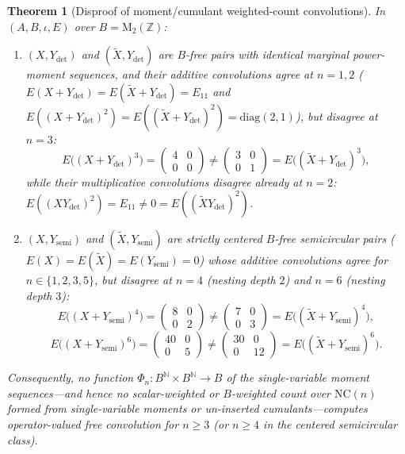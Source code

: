 \documentclass[11pt,a4paper]{article}
\newtheorem{theorem}{Theorem}[section]
\theoremstyle{definition}
\newcommand{\NC}{\mathrm{NC}}
\newcommand{\Mat}{\mathrm{M}}
\begin{document}
\begin{theorem}[Disproof of moment/cumulant weighted-count convolutions]\label{thm:moment-disproof}
In $(A, B, \iota, E)$ over $B = \Mat_2(\mathbb{Z})$:
\begin{enumerate}
\item $(X, Y_{\det})$ and $(\tilde{X}, Y_{\det})$ are $B$-free pairs with identical marginal power-moment sequences, and their additive convolutions agree at $n = 1, 2$ ($E(X + Y_{\det}) = E(\tilde{X} + Y_{\det}) = E_{11}$ and $E((X + Y_{\det})^2) = E((\tilde{X} + Y_{\det})^2) = \mathrm{diag}(2, 1)$), but disagree at $n = 3$:
\[
E\bigl((X + Y_{\det})^3\bigr) = \begin{pmatrix} 4 & 0 \\ 0 & 0 \end{pmatrix} \neq \begin{pmatrix} 3 & 0 \\ 0 & 1 \end{pmatrix} = E\bigl((\tilde{X} + Y_{\det})^3\bigr),
\]
while their multiplicative convolutions disagree already at $n = 2$: $E((X Y_{\det})^2) = E_{11} \neq 0 = E((\tilde{X} Y_{\det})^2)$.
\item $(X, Y_{\mathrm{semi}})$ and $(\tilde{X}, Y_{\mathrm{semi}})$ are strictly centered $B$-free semicircular pairs ($E(X) = E(\tilde{X}) = E(Y_{\mathrm{semi}}) = 0$) whose additive convolutions agree for $n \in \{1, 2, 3, 5\}$, but disagree at $n = 4$ (nesting depth $2$) and $n = 6$ (nesting depth $3$):
\[
E\bigl((X + Y_{\mathrm{semi}})^4\bigr) = \begin{pmatrix} 8 & 0 \\ 0 & 2 \end{pmatrix} \neq \begin{pmatrix} 7 & 0 \\ 0 & 3 \end{pmatrix} = E\bigl((\tilde{X} + Y_{\mathrm{semi}})^4\bigr),
\]
\[
E\bigl((X + Y_{\mathrm{semi}})^6\bigr) = \begin{pmatrix} 40 & 0 \\ 0 & 5 \end{pmatrix} \neq \begin{pmatrix} 30 & 0 \\ 0 & 12 \end{pmatrix} = E\bigl((\tilde{X} + Y_{\mathrm{semi}})^6\bigr).
\]
\end{enumerate}
Consequently, no function $\Phi_n \colon B^{\mathbb{N}} \times B^{\mathbb{N}} \to B$ of the single-variable moment sequences---and hence no scalar-weighted or $B$-weighted count over $\NC(n)$ formed from single-variable moments or un-inserted cumulants---computes operator-valued free convolution for $n \ge 3$ (or $n \ge 4$ in the centered semicircular class).
\end{theorem}
\end{document}
